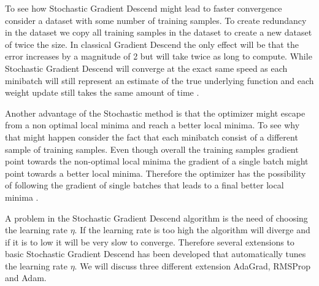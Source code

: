 To see how Stochastic Gradient Descend might lead to faster convergence consider
a dataset with some number of training samples. To create redundancy in the
dataset we copy all training samples in the dataset to create a new dataset of
twice the size. In classical Gradient Descend the only effect will be that the
error increases by a magnitude of 2 but will take twice as long to compute.
While Stochastic Gradient Descend will converge at the exact same speed as each
minibatch will still represent an estimate of the true underlying function and
each weight update still takes the same amount of time \cite{Bishop}.

Another advantage of the Stochastic method is that the optimizer might escape
from a non optimal local minima and reach a better local minima. To see why that
might happen consider the fact that each minibatch consist of a different sample
of training samples. Even though overall the training samples gradient point
towards the non-optimal local minima the gradient of a single batch might point
towards a better local minima. Therefore the optimizer has the possibility of
following the gradient of single batches that leads to a final better local
minima \cite{Bishop}.

A problem in the Stochastic Gradient Descend algorithm is the need of choosing
the learning rate $\eta$. If the learning rate is too high the algorithm will
diverge and if it is to low it will be very slow to converge. Therefore several
extensions to basic Stochastic Gradient Descend has been developed that
automatically tunes the learning rate $\eta$. We will discuss three different
extension \gls{AdaGrad}, \gls{RMSProp} and \gls{Adam}.

